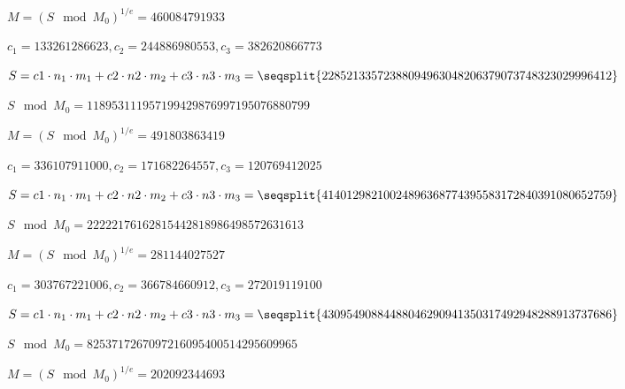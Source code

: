 $M = (S \mod{M_0})^{1/e} = 460084791933$


$c_1=133261286623, c_2=244886980553, c_3=382620866773$

$S = c1 \cdot n_1 \cdot m_1 + c2 \cdot n2 \cdot m_2 + c3 \cdot n3 \cdot m_3 = \seqsplit{22852133572388094963048206379073748323029996412}$

$S \mod{M_0} = 118953111957199429876997195076880799$

$M = (S \mod{M_0})^{1/e} = 491803863419$


$c_1=336107911000, c_2=171682264557, c_3=120769412025$

$S = c1 \cdot n_1 \cdot m_1 + c2 \cdot n2 \cdot m_2 + c3 \cdot n3 \cdot m_3 = \seqsplit{41401298210024896368774395583172840391080652759}$

$S \mod{M_0} = 22222176162815442818986498572631613$

$M = (S \mod{M_0})^{1/e} = 281144027527$


$c_1=303767221006, c_2=366784660912, c_3=272019119100$

$S = c1 \cdot n_1 \cdot m_1 + c2 \cdot n2 \cdot m_2 + c3 \cdot n3 \cdot m_3 = \seqsplit{43095490884488046290941350317492948288913737686}$

$S \mod{M_0} = 8253717267097216095400514295609965$

$M = (S \mod{M_0})^{1/e} = 202092344693$